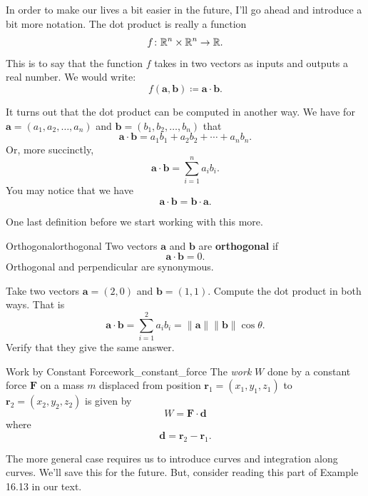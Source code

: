         In order to make our lives a bit easier in the future, I'll go ahead and introduce a bit more notation. The dot product is really a function
        \[
        f\colon \mathbb{R}^n \times \mathbb{R}^n \to \mathbb{R}.
        \]
        This is to say that the function $f$ takes in two vectors as inputs and outputs a real number.  We would write:
        \[
        f(\mathbf{a},\mathbf{b})\coloneqq \mathbf{a}\cdot \mathbf{b}.
        \]
        
        It turns out that the dot product can be computed in another way.  We have for $\mathbf{a}=(a_1,a_2,\dots,a_n)$ and $\mathbf{b}=(b_1,b_2,\dots,b_n)$ that
        \[
        \mathbf{a}\cdot \mathbf{b}=a_1b_1+a_2b_2+\cdots +a_nb_n.
        \]
        Or, more succinctly,
        \[
        \mathbf{a}\cdot \mathbf{b}=\sum_{i=1}^n a_ib_i.
        \]
        You may notice that we have
        \[
        \mathbf{a}\cdot \mathbf{b} = \mathbf{b}\cdot \mathbf{a}.
        \]
        
        One last definition before we start working with this more.
        \begin{df}{Orthogonal}{orthogonal}
        Two vectors $\mathbf{a}$ and $\mathbf{b}$ are \textbf{orthogonal}  if
        \[
        \mathbf{a}\cdot\mathbf{b}=0.
        \]
        Orthogonal and perpendicular are synonymous.
        \end{df}
        
        \begin{exercise}
        Take two vectors $\mathbf{a}=(2,0)$ and $\mathbf{b}=(1,1)$.  Compute the dot product in both ways.  That is
        \[
        \mathbf{a}\cdot \mathbf{b}=\sum_{i=1}^2 a_ib_i=\|\mathbf{a}\|\|\mathbf{b}\|\cos \theta.
        \]
        Verify that they give the same answer.
        \end{exercise}
        
        \begin{ex}{Work by Constant Force}{work_constant_force}
        The \emph{work} $W$ done by a constant force $\mathbf{F}$ on a mass $m$ displaced from position $\mathbf{r}_1=(x_1,y_1,z_1)$ to $\mathbf{r}_2=(x_2,y_2,z_2)$ is given by
        \[
        W=\mathbf{F}\cdot \mathbf{d}
        \]
        where
        \[
        \mathbf{d}=\mathbf{r}_2-\mathbf{r}_1.
        \]
        \end{ex}
        
        \begin{remark}
        The more general case requires us to introduce curves and integration along curves.  We'll save this for the future.  But, consider reading this part of Example 16.13 in our text.
        \end{remark}
        
